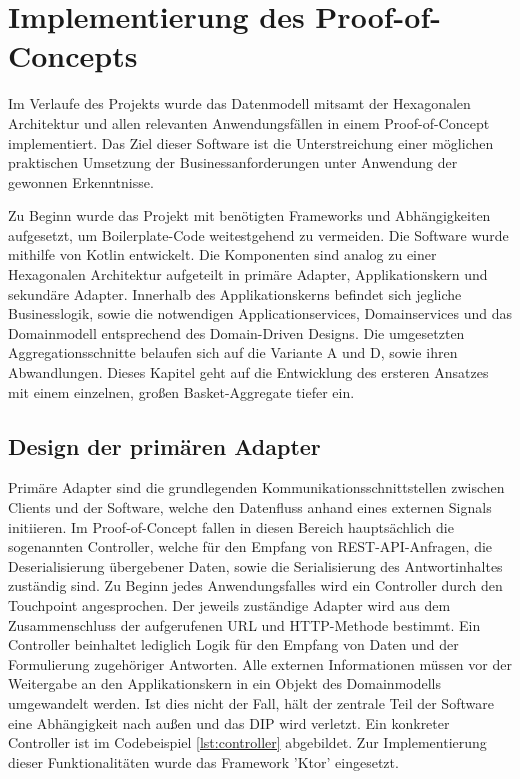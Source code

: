 \chapter{Implementierung des Proof-of-Concepts}

Im Verlaufe des Projekts wurde das Datenmodell mitsamt der Hexagonalen Architektur und allen relevanten Anwendungsfällen in einem Proof-of-Concept implementiert. Das Ziel dieser Software ist die Unterstreichung einer möglichen praktischen Umsetzung der Businessanforderungen unter Anwendung der gewonnen Erkenntnisse. 

Zu Beginn wurde das Projekt mit benötigten Frameworks und Abhängigkeiten aufgesetzt, um \gls{Boilerplate-Code} weitestgehend zu vermeiden. Die Software wurde mithilfe von Kotlin entwickelt. Die Komponenten sind analog zu einer Hexagonalen Architektur aufgeteilt in primäre Adapter, Applikationskern und sekundäre Adapter. Innerhalb des Applikationskerns befindet sich jegliche Businesslogik, sowie die notwendigen Applicationservices, Domainservices und das Domainmodell entsprechend des Domain-Driven Designs. Die umgesetzten Aggregationsschnitte belaufen sich auf die Variante A und D, sowie ihren Abwandlungen. Dieses Kapitel geht auf die Entwicklung des ersteren Ansatzes mit einem einzelnen, großen Basket-Aggregate tiefer ein.

\section{Design der primären Adapter}

Primäre Adapter sind die grundlegenden Kommunikationsschnittstellen zwischen Clients und der Software, welche den Datenfluss anhand eines externen Signals initiieren. Im Proof-of-Concept fallen in diesen Bereich hauptsächlich die sogenannten Controller, welche für den Empfang von REST-API-Anfragen, die Deserialisierung übergebener Daten, sowie die Serialisierung des Antwortinhaltes zuständig sind. Zu Beginn jedes Anwendungsfalles wird ein Controller durch den Touchpoint angesprochen. Der jeweils zuständige Adapter wird aus dem Zusammenschluss der aufgerufenen URL und HTTP-Methode bestimmt. Ein Controller beinhaltet lediglich Logik für den Empfang von Daten und der Formulierung zugehöriger Antworten. Alle externen Informationen müssen vor der Weitergabe an den Applikationskern in ein Objekt des Domainmodells umgewandelt werden. Ist dies nicht der Fall, hält der zentrale Teil der Software eine Abhängigkeit nach außen und das \acrlong{DIP} wird verletzt. Ein konkreter Controller ist im Codebeispiel \ref{lst:controller} abgebildet. Zur Implementierung dieser Funktionalitäten wurde das Framework 'Ktor' eingesetzt.

